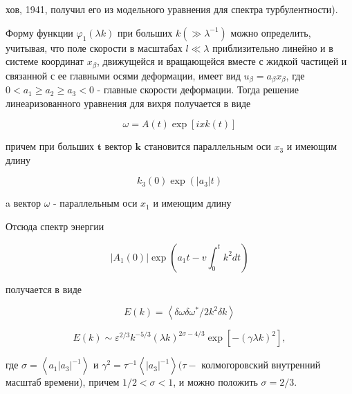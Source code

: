 \documentclass[10pt]{article}
\begin{document}
хов, 1941, получил его из модельного уравнения для спектра турбулентности).



Форму функции $\varphi_{1}(\lambda k)$ при больших $k\left(\gg \lambda^{-1}\right)$ можно определить, учитывая, что поле скорости в масштабах $l \ll \lambda$ приблизительно линейно и в системе координат $x_{\beta}$, движущейся и вращающейся вместе с жидкой частицей и связанной с ее главными осями деформации, имеет вид $u_{\beta}=a_{\beta} x_{\beta}$, где $0<a_{1} \geqslant a_{2} \geqslant a_{3}<0$ - главные скорости деформации. Тогда решение линеаризованного уравнения для вихря получается в виде



\[

\omega=A(t) \exp [i x k(t)]

\]



причем при больших $\boldsymbol{t}$ вектор $\boldsymbol{k}$ становится параллельным оси $x_{3}$ и имеющим длину



\[

k_{3}(0) \exp \left(\left|a_{3}\right| t\right)

\]



a вектор $\omega$ - параллельным оси $x_{1}$ и имеющим длину



Отсюда спектр энергии



\[

\left|A_{1}(0)\right| \exp \left(a_{1} t-v \int_{0}^{t} k^{2} d t\right)

\]



получается в виде



\[

E(k)=\left\langle\delta \omega \delta \omega^{*} / 2 k^{2} \delta k\right\rangle

\]



\[

E(k) \sim \varepsilon^{2 / 3} k^{-5 / 3}(\lambda k)^{2 \sigma-4 / 3} \exp \left[-(\gamma \lambda k)^{2}\right],

\]



где $\sigma=\left\langle a_{1}\left|a_{3}\right|^{-1}\right\rangle$ и $\gamma^{2}=\tau^{-1}\left\langle\left|a_{3}\right|^{-1}\right\rangle(\tau-$ колмогоровский внутренний масштаб времени), причем $1 / 2<\sigma<1$, и можно положить $\sigma=2 / 3$.
\end{document}
